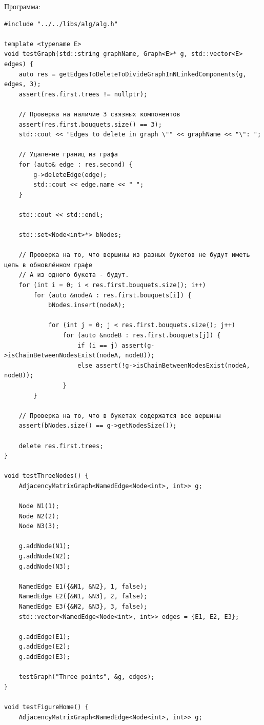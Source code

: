 \documentclass[a4paper,14pt]{extarticle}
\begin{document}
\begin{enumerate}[1.]
        Программа:
        \begin{verbatim}
#include "../../libs/alg/alg.h"

template <typename E>
void testGraph(std::string graphName, Graph<E>* g, std::vector<E> edges) {
    auto res = getEdgesToDeleteToDivideGraphInNLinkedComponents(g, edges, 3);
    assert(res.first.trees != nullptr);

    // Проверка на наличие 3 связных компонентов
    assert(res.first.bouquets.size() == 3);
    std::cout << "Edges to delete in graph \"" << graphName << "\": ";

    // Удаление границ из графа
    for (auto& edge : res.second) {
        g->deleteEdge(edge);
        std::cout << edge.name << " ";
    }

    std::cout << std::endl;

    std::set<Node<int>*> bNodes;

    // Проверка на то, что вершины из разных букетов не будут иметь цепь в обновлённом графе
    // А из одного букета - будут. 
    for (int i = 0; i < res.first.bouquets.size(); i++)
        for (auto &nodeA : res.first.bouquets[i]) {
            bNodes.insert(nodeA);

            for (int j = 0; j < res.first.bouquets.size(); j++)      
                for (auto &nodeB : res.first.bouquets[j]) {
                    if (i == j) assert(g->isChainBetweenNodesExist(nodeA, nodeB));
                    else assert(!g->isChainBetweenNodesExist(nodeA, nodeB));
                }
        }

    // Проверка на то, что в букетах содержатся все вершины
    assert(bNodes.size() == g->getNodesSize());

    delete res.first.trees;
}

void testThreeNodes() {
    AdjacencyMatrixGraph<NamedEdge<Node<int>, int>> g;

    Node N1(1);
    Node N2(2);
    Node N3(3);

    g.addNode(N1);
    g.addNode(N2);
    g.addNode(N3);

    NamedEdge E1({&N1, &N2}, 1, false);
    NamedEdge E2({&N1, &N3}, 2, false);
    NamedEdge E3({&N2, &N3}, 3, false);
    std::vector<NamedEdge<Node<int>, int>> edges = {E1, E2, E3};

    g.addEdge(E1);
    g.addEdge(E2);
    g.addEdge(E3);

    testGraph("Three points", &g, edges);
}

void testFigureHome() {
    AdjacencyMatrixGraph<NamedEdge<Node<int>, int>> g;


\end{verbatim}
\end{enumerate}
\end{document}
